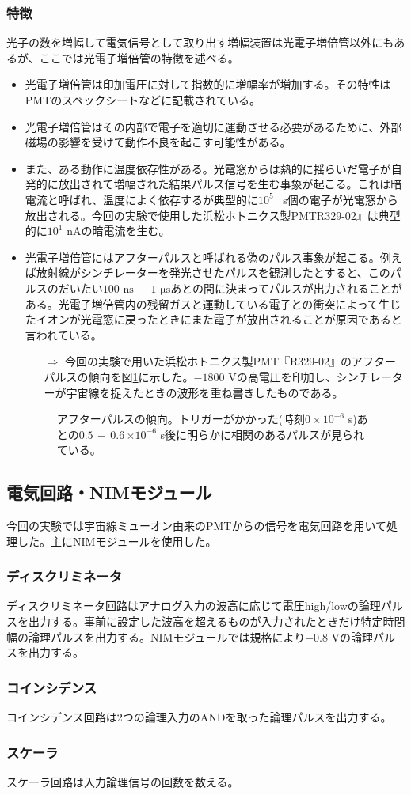 \documentclass[../../main.tex]{subfiles}
\numberwithin{equation}{section}
\numberwithin{table}{section}
\numberwithin{figure}{section}
\begin{document}
    \subsubsection{特徴}
      光子の数を増幅して電気信号として取り出す増幅装置は光電子増倍管以外にもあるが、ここでは光電子増倍管の特徴を述べる。
      \begin{itemize}
        \item 光電子増倍管は印加電圧に対して指数的に増幅率が増加する。その特性はPMTのスペックシートなどに記載されている。
        \item 光電子増倍管はその内部で電子を適切に運動させる必要があるために、外部磁場の影響を受けて動作不良を起こす可能性がある。
        \item また、ある動作に温度依存性がある。光電窓からは熱的に揺らいだ電子が自発的に放出されて増幅された結果パルス信号を生む事象が起こる。これは暗電流と呼ばれ、温度によく依存するが典型的に$10^5$ \si{\per\second}個の電子が光電窓から放出される。今回の実験で使用した浜松ホトニクス製PMTR329-02』は典型的に$10^1$ \si{\nano\ampere}の暗電流を生む。
        \item 光電子増倍管にはアフターパルスと呼ばれる偽のパルス事象が起こる。例えば放射線がシンチレーターを発光させたパルスを観測したとすると、このパルスのだいたい$100\,\,\si{\nano\second}\,-\,1\,\,\si{\micro\second}$あとの間に決まってパルスが出力されることがある。光電子増倍管内の残留ガスと運動している電子との衝突によって生じたイオンが光電窓に戻ったときにまた電子が放出されることが原因であると言われている。
        \begin{itemize}
          \item[$\Rightarrow$] 今回の実験で用いた浜松ホトニクス製PMT『R329-02』のアフターパルスの傾向を図\ref{fig:afterpulse}に示した。$-1800$ Vの高電圧を印加し、シンチレーターが宇宙線を捉えたときの波形を重ね書きしたものである。
        \end{itemize}
        \begin{figure}[H]
          \centering
          \caption{アフターパルスの傾向。トリガーがかかった(時刻$0\times10^{-6}$ s)あとの$0.5\,-\,0.6$\,$\times10^{-6}$ s後に明らかに相関のあるパルスが見られている。}\label{fig:afterpulse}
        \end{figure}
      \end{itemize}
  \subsection{電気回路・NIMモジュール}
    今回の実験では宇宙線ミューオン由来のPMTからの信号を電気回路を用いて処理した。主にNIMモジュールを使用した。
    \subsubsection{ディスクリミネータ}
      ディスクリミネータ回路はアナログ入力の波高に応じて電圧high/lowの論理パルスを出力する。事前に設定した波高を超えるものが入力されたときだけ特定時間幅の論理パルスを出力する。NIMモジュールでは規格により$-0.8$ Vの論理パルスを出力する。
    \subsubsection{コインシデンス}
      コインシデンス回路は2つの論理入力のANDを取った論理パルスを出力する。
    \subsubsection{スケーラ}
      スケーラ回路は入力論理信号の回数を数える。
\end{document}
